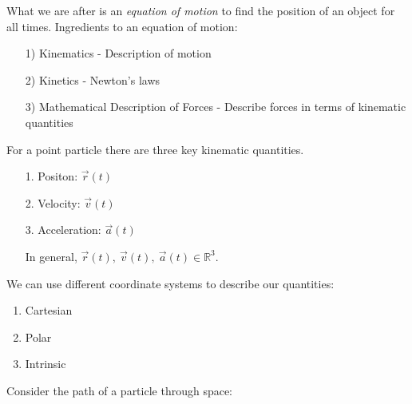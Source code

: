 \setcounter{lecture}{1}
\pagebreak
{}



\setcounter{page}{4}

What we are after is an \emph{equation of motion} to find the position of an object for all times. Ingredients to an equation of motion:\begin{enumerate}
\item[1)] Kinematics - Description of motion 
\item[2)] Kinetics - Newton's laws
\item[3)] Mathematical Description of Forces - Describe forces in terms of kinematic quantities
\end{enumerate}


\label{sub:sets}



For a point particle there are three key kinematic quantities.\begin{enumerate}
\item[1.] Positon: $\vec{r}(t)$
\item[2.] Velocity: $\vec{v}(t)$
\item[3.] Acceleration: $\vec{a}(t)$

In general, $\vec{r}(t),~\vec{v}(t),~\vec{a}(t) \in \mathbb{R}^3$. 
\end{enumerate}\vspace*{5pt}

We can use different coordinate systems to describe our quantities:
\begin{enumerate}
\item Cartesian
\item Polar
\item Intrinsic	
\end{enumerate}

Consider the path of a particle through space:

\vspace*{100pt}

